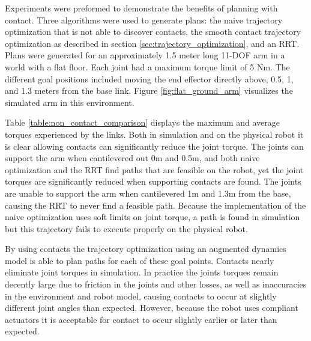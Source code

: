 \documentclass[../thesis.tex]{subfiles}
\begin{document}
Experiments were preformed to demonstrate the benefits of planning with contact.
Three algorithms were used to generate plans: the naive trajectory optimization that is not able to discover contacts, the smooth contact trajectory optimization as described in section \ref{sec:trajectory_optimization},  and an RRT. 
Plans were generated for an approximately 1.5 meter long 11-DOF arm in a world with a flat floor.
Each joint had a maximum torque limit of 5 Nm.
The different goal positions included moving the end effector directly above, 0.5, 1, and 1.3 meters from the base link.
Figure \ref{fig:flat_ground_arm} visualizes the simulated arm in this environment.

Table \ref{table:non_contact_comparison} displays the maximum and average torques experienced by the links.
Both in simulation and on the physical robot it is clear allowing contacts can significantly reduce the joint torque.
The joints can support the arm when cantilevered out 0m and 0.5m, and both naive optimization and the RRT find paths that are feasible on the robot, yet the joint torques are significantly reduced when supporting contacts are found.
The joints are unable to support the arm when cantilevered 1m and 1.3m from the base, causing the RRT to never find a feasible path. Because the implementation of the naive optimization uses soft limits on joint torque, a path is found in simulation but this trajectory fails to execute properly on the physical robot.

By using contacts the trajectory optimization using an augmented dynamics model is able to plan paths for each of these goal points.
Contacts nearly eliminate joint torques in simulation.
In practice the joints torques remain decently large due to friction in the joints and other losses, as well as inaccuracies in the environment and robot model, causing contacts to occur at slightly different joint angles than expected.
However, because the robot uses compliant actuators it is acceptable for contact to occur slightly earlier or later than expected.
\end{document}
